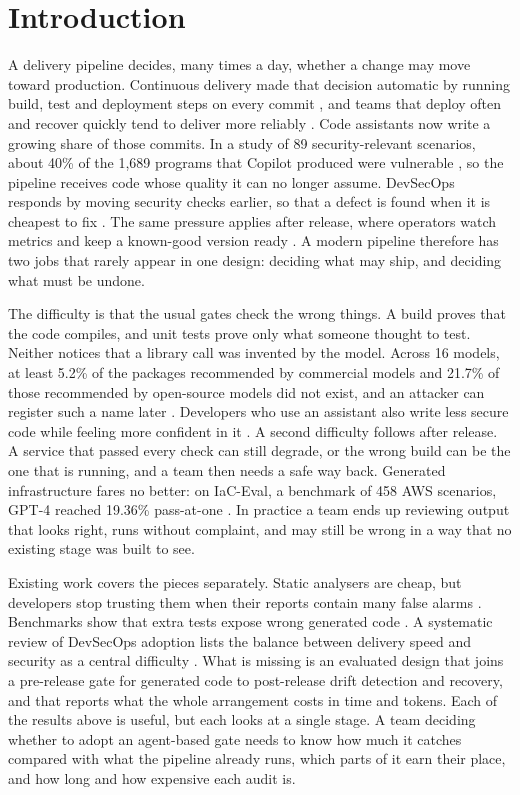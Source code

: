 \documentclass[12pt,onecolumn,draftclsnofoot]{IEEEtran}
\begin{document}
\section{Introduction}
A delivery pipeline decides, many times a day, whether a change may move toward production. Continuous delivery made that decision automatic by running build, test and deployment steps on every commit \cite{humble2010}, and teams that deploy often and recover quickly tend to deliver more reliably \cite{forsgren2018}. Code assistants now write a growing share of those commits. In a study of 89 security-relevant scenarios, about 40\% of the 1,689 programs that Copilot produced were vulnerable \cite{pearce2022}, so the pipeline receives code whose quality it can no longer assume. DevSecOps responds by moving security checks earlier, so that a defect is found when it is cheapest to fix \cite{rajapakse2022}. The same pressure applies after release, where operators watch metrics and keep a known-good version ready \cite{beyer2016}. A modern pipeline therefore has two jobs that rarely appear in one design: deciding what may ship, and deciding what must be undone.

The difficulty is that the usual gates check the wrong things. A build proves that the code compiles, and unit tests prove only what someone thought to test. Neither notices that a library call was invented by the model. Across 16 models, at least 5.2\% of the packages recommended by commercial models and 21.7\% of those recommended by open-source models did not exist, and an attacker can register such a name later \cite{spracklen2025}. Developers who use an assistant also write less secure code while feeling more confident in it \cite{perry2023}. A second difficulty follows after release. A service that passed every check can still degrade, or the wrong build can be the one that is running, and a team then needs a safe way back. Generated infrastructure fares no better: on IaC-Eval, a benchmark of 458 AWS scenarios, GPT-4 reached 19.36\% pass-at-one \cite{kon2024}. In practice a team ends up reviewing output that looks right, runs without complaint, and may still be wrong in a way that no existing stage was built to see.

Existing work covers the pieces separately. Static analysers are cheap, but developers stop trusting them when their reports contain many false alarms \cite{johnson2013}. Benchmarks show that extra tests expose wrong generated code \cite{liu2023evalplus}. A systematic review of DevSecOps adoption lists the balance between delivery speed and security as a central difficulty \cite{rajapakse2022}. What is missing is an evaluated design that joins a pre-release gate for generated code to post-release drift detection and recovery, and that reports what the whole arrangement costs in time and tokens. Each of the results above is useful, but each looks at a single stage. A team deciding whether to adopt an agent-based gate needs to know how much it catches compared with what the pipeline already runs, which parts of it earn their place, and how long and how expensive each audit is.
\end{document}
